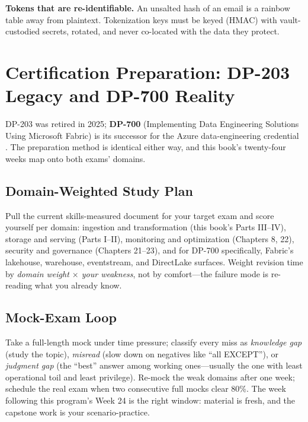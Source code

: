\begin{pitfall}
\textbf{Tokens that are re-identifiable.} An unsalted hash of an email is a rainbow table away from plaintext. Tokenization keys must be keyed (HMAC) with vault-custodied secrets, rotated, and never co-located with the data they protect.
\end{pitfall}

\section{Certification Preparation: DP-203 Legacy and DP-700 Reality}
DP-203 was retired in 2025; \textbf{DP-700} (Implementing Data Engineering Solutions Using Microsoft Fabric) is its successor for the Azure data-engineering credential \cite{microsoft2025dp700}. The preparation method is identical either way, and this book's twenty-four weeks map onto both exams' domains.

\subsection{Domain-Weighted Study Plan}
Pull the current skills-measured document for your target exam and score yourself per domain: ingestion and transformation (this book's Parts III--IV), storage and serving (Parts I--II), monitoring and optimization (Chapters 8, 22), security and governance (Chapters 21--23), and for DP-700 specifically, Fabric's lakehouse, warehouse, eventstream, and DirectLake surfaces. Weight revision time by \emph{domain weight $\times$ your weakness}, not by comfort---the failure mode is re-reading what you already know.

\subsection{Mock-Exam Loop}
Take a full-length mock under time pressure; classify every miss as \emph{knowledge gap} (study the topic), \emph{misread} (slow down on negatives like ``all EXCEPT''), or \emph{judgment gap} (the ``best'' answer among working ones---usually the one with least operational toil and least privilege). Re-mock the weak domains after one week; schedule the real exam when two consecutive full mocks clear 80\%. The week following this program's Week 24 is the right window: material is fresh, and the capstone work is your scenario-practice.

